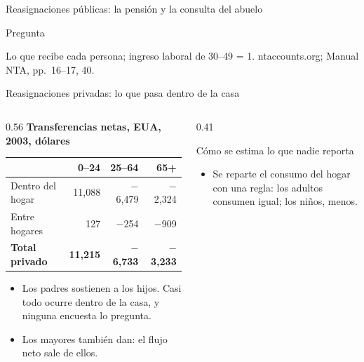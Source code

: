 \documentclass[aspectratio=169,11pt]{beamer}
\newcommand{\fuente}[1]{\par\vfill{\small\color{cGris}#1\par}}
\begin{document}
\begin{frame}{Reasignaciones públicas: la pensión y la consulta del abuelo}
\begin{alertblock}{Pregunta}
  \end{alertblock}
  \fuente{Lo que recibe cada persona; ingreso laboral de 30--49 = 1. ntaccounts.org; Manual NTA, pp.~16--17, 40.}
\end{frame}

\begin{frame}{Reasignaciones privadas: lo que pasa dentro de la casa}
  \begin{columns}[T]
    \begin{column}{0.56\textwidth}
      \textbf{Transferencias netas, EUA, 2003, dólares}\par\smallskip
      \begin{tabular}{@{}lrrr@{}}
        \toprule
        & 0--24 & 25--64 & 65+ \\
        \midrule
        Dentro del hogar & 11,088 & $-$6,479 & $-$2,324 \\
        Entre hogares & 127 & $-$254 & $-$909 \\
        \midrule
        \textbf{Total privado} & \textbf{11,215} & \textbf{$-$6,733} & \textbf{$-$3,233} \\
        \bottomrule
      \end{tabular}
      \par\medskip
      \begin{itemize}
        \item Los padres sostienen a los hijos. Casi todo ocurre dentro de la casa, y ninguna encuesta lo pregunta.
        \item Los mayores también dan: el flujo neto sale de ellos.
      \end{itemize}
    \end{column}
    \begin{column}{0.41\textwidth}
      \pause
      \begin{block}{Cómo se estima lo que nadie reporta}
        \begin{itemize}
          \item Se reparte el consumo del hogar con una regla: los adultos consumen igual; los niños, menos.

\end{itemize}
\end{block}
\end{column}
\end{columns}
\end{frame}
\end{document}

